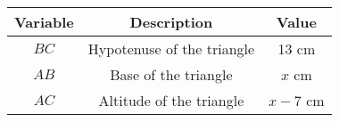 \begin{tabular}[12pt]{ |c| c| c|}
    \hline
    \textbf{Variable} & \textbf{Description} & \textbf{Value}\\
	\hline
	$BC$ & Hypotenuse of the triangle & 13 cm\\
	\hline
	$AB$ & Base of the triangle & $x$ cm\\
	\hline
	$AC$ & Altitude of the triangle & $x - 7$ cm\\
	\hline
\end{tabular}